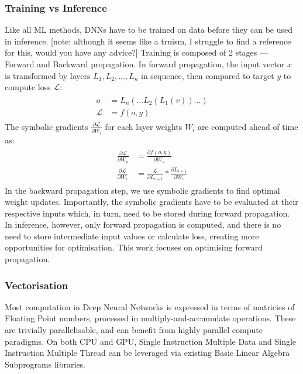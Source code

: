 \documentclass[12pt]{article}
\newcommand{\Loss}{\mathcal{L}}
\begin{document}
\subsubsection{Training vs Inference}
Like all ML methods, DNNs have to be trained on data before they can be used in inference.
[note: although it seems like a truism, I struggle to find a reference for this, would you have any advice?]
Training is composed of 2 stages --- Forward and Backward propagation.
In forward propagation, the input vector $x$ is transformed by layers $L_1, L_2,..., L_n$
in sequence,
then compared to target $y$ to compute loss $\Loss$:
\begin{gather}
\begin{split}
    o &= L_n( ... L_2(L_1(v)) ... )\\
    \Loss &= f(o, y)
\end{split}
\end{gather}
The symbolic gradients $\frac{\partial \Loss}{\partial W_i}$ for each layer weights $W_i$
are computed ahead of time as:
\begin{gather}
\begin{split}
    \frac{\partial \Loss}{\partial W_n} &= \frac{\partial f(o, y)}{\partial W_n}\\
    \frac{\partial \Loss}{\partial W_i} &= \frac{\Loss}{\partial L_{i+1}} * \frac{\partial
    L_{i+1}}{\partial W_i}
\end{split}
\end{gather}
In the backward propagation step, we use symbolic gradients to find optimal weight updates.
Importantly, the symbolic gradients have to be evaluated at their respective inputs which,
in turn, need to be stored during forward propagation.
In inference, however, only forward propagation is computed, and there is no need to store
intermediate input values or calculate loss, creating more opportunities for optimisation.
This work focuses on optimising forward propagation.


\subsubsection{Vectorisation}
Most computation in Deep Neural Networks is expressed in terms of matricies of Floating Point
numbers, processed in multiply-and-accumulate operations.
These are trivially parallelisable, and can benefit from highly parallel compute
paradigms\cite{sze2017efficient}.
On both CPU and GPU, Single Instruction Multiple Data and Single Instruction Multiple Thread
can be leveraged via existing Basic Linear Algebra Subprograms libraries.
\end{document}
